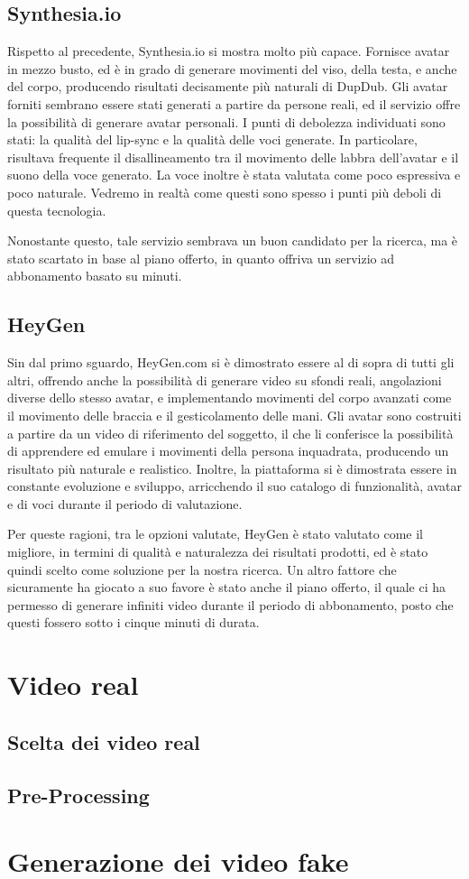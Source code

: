 \subsection{Synthesia.io}

Rispetto al precedente, Synthesia.io si mostra molto più capace. Fornisce avatar in mezzo busto, ed è in grado di generare movimenti del viso, della testa, e anche del corpo, producendo risultati decisamente più naturali di DupDub. Gli avatar forniti sembrano essere stati generati a partire da persone reali, ed il servizio offre la possibilità di generare avatar personali. I punti di debolezza individuati sono stati: la qualità del lip-sync e la qualità delle voci generate. In particolare, risultava frequente il disallineamento tra il movimento delle labbra dell'avatar e il suono della voce generato. La voce inoltre è stata valutata come poco espressiva e poco naturale. Vedremo in realtà come questi sono spesso i punti più deboli di questa tecnologia.

Nonostante questo, tale servizio sembrava un buon candidato per la ricerca, ma è stato scartato in base al piano offerto, in quanto offriva un servizio ad abbonamento basato su minuti. %

\subsection{HeyGen}

Sin dal primo sguardo, HeyGen.com si è dimostrato essere al di sopra di tutti gli altri, offrendo anche la possibilità di generare video su sfondi reali, angolazioni diverse dello stesso avatar, e implementando movimenti del corpo avanzati come il movimento delle braccia e il gesticolamento delle mani. Gli avatar sono costruiti a partire da un video di riferimento del soggetto, il che li conferisce la possibilità di apprendere ed emulare i movimenti della persona inquadrata, producendo un risultato più naturale e realistico. Inoltre, la piattaforma si è dimostrata essere in constante evoluzione e sviluppo, arricchendo il suo catalogo di funzionalità, avatar e di voci durante il periodo di valutazione.

Per queste ragioni, tra le opzioni valutate, HeyGen è stato valutato come il migliore, in termini di qualità e naturalezza dei risultati prodotti, ed è stato quindi scelto come soluzione per la nostra ricerca. Un altro fattore che sicuramente ha giocato a suo favore è stato anche il piano offerto, il quale ci ha permesso di generare infiniti video durante il periodo di abbonamento, posto che questi fossero sotto i cinque minuti di durata.

\section{Video real}
\subsection{Scelta dei video real}
\subsection{Pre-Processing}
\section{Generazione dei video fake}

\clearpage